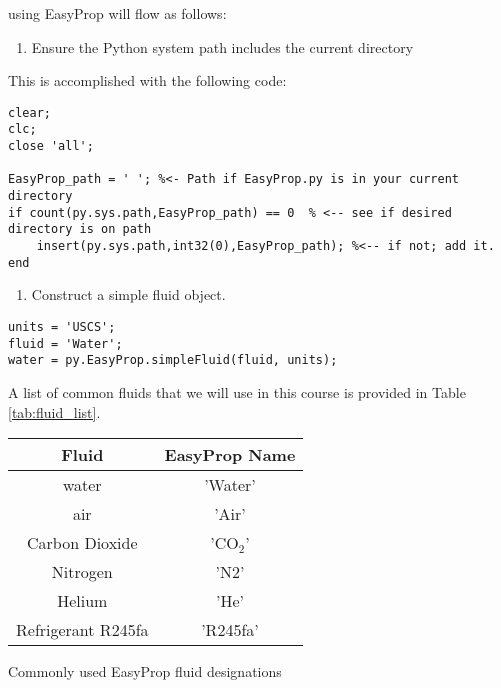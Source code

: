  using EasyProp will flow as follows:

\begin{enumerate}
\item Ensure the Python system path includes the current directory 
\end{enumerate}


This is accomplished with the following code:
\begin{lstlisting}[caption=Add the current directory to the Python system path, label={EP_setPath}]
%% Prepare the environment
clear;
clc;
close 'all';

EasyProp_path = ' '; %<- Path if EasyProp.py is in your current directory
if count(py.sys.path,EasyProp_path) == 0  % <-- see if desired directory is on path
    insert(py.sys.path,int32(0),EasyProp_path); %<-- if not; add it.
end
\end{lstlisting}

\begin{enumerate}[resume]
\item Construct a simple fluid object.
\end{enumerate}
\begin{lstlisting}[caption=Construct a \emph{simpleFluid} object]
units = 'USCS';
fluid = 'Water';
water = py.EasyProp.simpleFluid(fluid, units);
\end{lstlisting}
A list of common fluids that we will use in this course is provided in Table \ref{tab:fluid_list}.
\begin{margintable}
\begin{tabular}{cc}
\toprule
Fluid & EasyProp Name \\
\midrule
water & 'Water' \\
air & 'Air' \\
Carbon Dioxide & 'CO$_2$' \\
Nitrogen & 'N2' \\
Helium & 'He' \\
Refrigerant R245fa & 'R245fa' \\
\bottomrule
\end{tabular}
\caption{Commonly used EasyProp fluid designations}
\label{tab:fluid_list}
\end{margintable}

